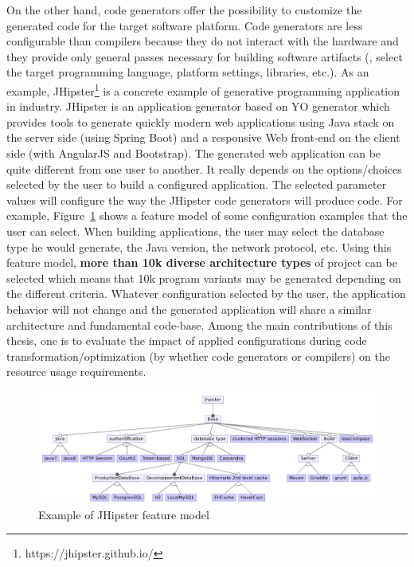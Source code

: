 On the other hand, code generators offer the possibility to customize the generated code for the target software platform. Code generators are less configurable than compilers because they do not interact with the hardware and they provide only general passes necessary for building software artifacts (\eg, select the target programming language, platform settings, libraries, etc.).
As an example, JHipster\footnote{https://jhipster.github.io/} is a concrete example of generative programming application in industry. JHipster is an application generator based on YO generator which provides tools to generate quickly modern web applications using Java stack on the server side (using Spring Boot) and a responsive Web front-end on the client side (with AngularJS and Bootstrap).
The generated web application can be quite different from one user to another. It really depends on the options/choices selected by the user to build a configured application. The selected parameter values will configure the way the JHipster code generators will produce code. 
For example, Figure~\ref{fig:jhipster} shows a feature model of some configuration examples that the user can select. When building applications, the user may select the database type he would generate, the Java version, the network protocol, etc. 
Using this feature model, \textbf{more than 10k diverse architecture types} of project can be selected which means that 10k program variants may be generated depending on the different criteria.
Whatever configuration selected by the user, the application behavior will not change and the generated application will share a similar architecture and fundamental code-base.
Among the main contributions of this thesis, one is to evaluate the impact of applied configurations during code transformation/optimization (by whether code generators or compilers) on the resource usage requirements.
\begin{figure}[h]
	\center
	\includegraphics[scale=0.65]{Background/fig/jhipster}
	\caption{Example of JHipster feature model}
	\label{fig:jhipster}
\end{figure}

